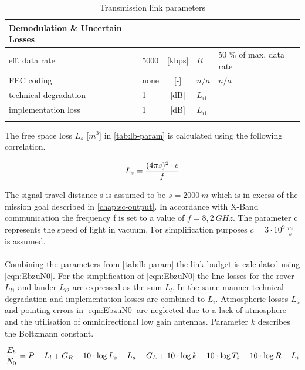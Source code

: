 \begin{table}[h]
\begin{tabular}{llclll}
Demodulation \& Uncertain Losses &        &            &               &                              &  \\ \hline\hline
eff. data rate                   & 5000   & {[}kbps{]} & ${R}$         & 50 \% of max. data rate                            &  \\
FEC coding                       & none   & {[}-{]}    & ${n/a}$       &  ${n/a}$                            &  \\
technical degradation            & 1      & {[}dB{]}   & ${L}_{i1}$    & \cite{FLP_Exercise}                          &  \\
implementation loss              & 1      & {[}dB{]}   & ${L}_{i1}$	   & \cite{FLP_Exercise}                          &  \\
                                 &        &            &               &                              & 
\end{tabular}
\caption{Transmission link parameters}
\label{tab:lb-param}
\end{table}


The free space loss ${L}_{s}$ [$m^3$] in \autoref{tab:lb-param} is calculated using the following correlation. 

\begin{equation}
	\centering
		{L}_{s} = {\frac{(4 \pi s)^2 \cdot c}{f}}
	\label{eqn:Ls}
\end{equation}

The signal travel distance {s} is assumed to be $s = 2000\ m$ which is in excess of the mission goal described in \autoref{chap:sc-output}. In accordance with X-Band communication the frequency {f} is set to a value of $f = 8,2\ GHz$. The parameter c represents the speed of light in vacuum. For simplification purposes $c = 3 \cdot 10^9\ \frac{m}{s}$ is assumed. \\ \\   
Combining the parameters from \autoref{tab:lb-param} the link budget is calculated using \autoref{eqn:EbzuN0}. For the simplification of \autoref{eqn:EbzuN0} the line losses for the rover ${L}_{l1}$ and lander ${L}_{l2}$ are expressed as the sum ${L}_{l}$. In the same manner technical degradation and implementation losses are combined to ${L}_{i}$. Atmospheric losses ${L}_{a}$ and pointing errors in \autoref{eqn:EbzuN0} are neglected due to a lack of atmosphere and the utilisation of omnidirectional low gain antennas. Parameter ${k}$ describes the Boltzmann constant.   

\begin{equation}
  \centering
		{\frac{{E}_{b}}{{N}_{0}}} = {P} - {L}_{l} + {G}_{R} - {10\cdot \log{{L}_{s}}} - {L}_{a} + {G}_{L} + {10\cdot \log{k}} - {10\cdot \log{{T}_{s}}} - {10\cdot \log{{R}}} - {L}_{i}
	\label{eqn:EbzuN0}
\end{equation}


